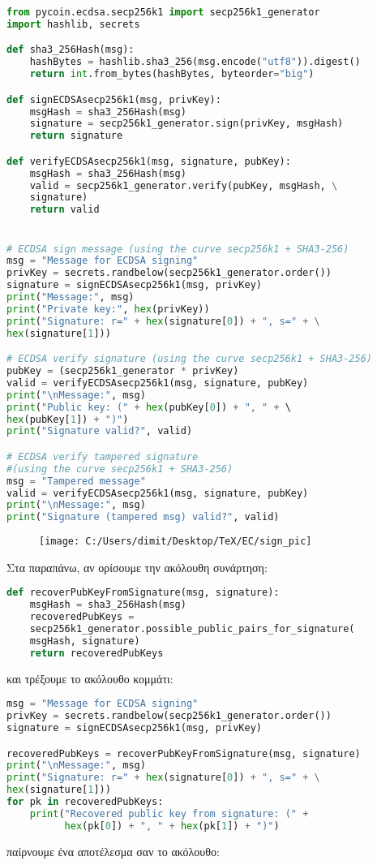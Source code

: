 \documentclass[oneside,a4paper]{article}
\begin{document}
\begin{lstlisting}[language=Python]
from pycoin.ecdsa.secp256k1 import secp256k1_generator
import hashlib, secrets

def sha3_256Hash(msg):
	hashBytes = hashlib.sha3_256(msg.encode("utf8")).digest()
	return int.from_bytes(hashBytes, byteorder="big")

def signECDSAsecp256k1(msg, privKey):
	msgHash = sha3_256Hash(msg)
	signature = secp256k1_generator.sign(privKey, msgHash)
	return signature

def verifyECDSAsecp256k1(msg, signature, pubKey):
	msgHash = sha3_256Hash(msg)
	valid = secp256k1_generator.verify(pubKey, msgHash, \
	signature)
	return valid


# ECDSA sign message (using the curve secp256k1 + SHA3-256)
msg = "Message for ECDSA signing"
privKey = secrets.randbelow(secp256k1_generator.order())
signature = signECDSAsecp256k1(msg, privKey)
print("Message:", msg)
print("Private key:", hex(privKey))
print("Signature: r=" + hex(signature[0]) + ", s=" + \
hex(signature[1]))

# ECDSA verify signature (using the curve secp256k1 + SHA3-256)
pubKey = (secp256k1_generator * privKey)   	
valid = verifyECDSAsecp256k1(msg, signature, pubKey)
print("\nMessage:", msg)
print("Public key: (" + hex(pubKey[0]) + ", " + \ 
hex(pubKey[1]) + ")")
print("Signature valid?", valid)

# ECDSA verify tampered signature 
#(using the curve secp256k1 + SHA3-256)
msg = "Tampered message"
valid = verifyECDSAsecp256k1(msg, signature, pubKey)
print("\nMessage:", msg)
print("Signature (tampered msg) valid?", valid)
\end{lstlisting}

\begin{figure}[H]
	\centering
	\texttt{[image: C:/Users/dimit/Desktop/TeX/EC/sign\_pic]}
\end{figure}

Στα παραπάνω, αν ορίσουμε την ακόλουθη συνάρτηση:
\begin{lstlisting}[language = Python]
def recoverPubKeyFromSignature(msg, signature):
    msgHash = sha3_256Hash(msg)
    recoveredPubKeys = 
	secp256k1_generator.possible_public_pairs_for_signature(
	msgHash, signature)
    return recoveredPubKeys
\end{lstlisting}

και τρέξουμε το ακόλουθο κομμάτι:
\begin{lstlisting}[language=Python]
msg = "Message for ECDSA signing"
privKey = secrets.randbelow(secp256k1_generator.order())
signature = signECDSAsecp256k1(msg, privKey)

recoveredPubKeys = recoverPubKeyFromSignature(msg, signature)
print("\nMessage:", msg)
print("Signature: r=" + hex(signature[0]) + ", s=" + \
hex(signature[1]))
for pk in recoveredPubKeys:
    print("Recovered public key from signature: (" +
          hex(pk[0]) + ", " + hex(pk[1]) + ")")
\end{lstlisting}
παίρνουμε ένα αποτέλεσμα σαν το ακόλουθο:
\end{document}
